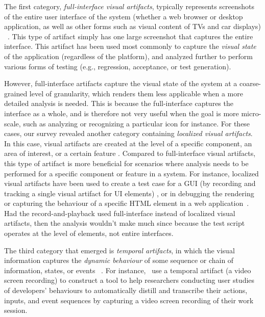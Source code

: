 The first category, \emph{full-interface visual artifacts}, typically represents
screenshots of the entire user interface of the system (whether a web browser or
desktop application, as well as other forms such as visual content of TVs and car displays)
~\cite{Choudhary-2010-ICSM,Delamaro-2011-STVR,
Choudhary-2012-ICST,Semenenko-2013-ICSM,Choudhary-2013-ICSE,Nguyen-2015-ASE,
Mahajan-2015-ICST,Deka-2016-UIST, Hori-2015-SEKE,Mahajan-2016-ICST,Feng-2016-ASE,
Patric-2016-ASE,Deka-2017-UIST,Wan-2017-STVR,He-2016-ICWS,Zhang-2017-ASE,Chen-2017-IUI,
Kirac-2018-JSS,Xu-2018-TOIT,Kuchta-2018-EMSE}.
This type of artifact simply has one large screenshot that captures the entire interface. 
This artifact has been used most commonly to capture the \textit{visual state} of the application
(regardless of the platform), and analyzed further to perform various forms of testing
(e.g., regression, acceptance, or test generation).

However, full-interface artifacts capture the visual state of the system at a coarse-grained
level of granularity, which renders them less applicable when a more detailed analysis is needed. This is because the full-interface 
captures the interface as a whole, and is therefore not very useful when the goal is more micro-scale, such as analyzing or recognizing a particular icon for instance. 
For these cases, our survey revealed another category containing  \emph{localized visual artifacts}.
In this case, visual artifacts are created at the level of a 
specific component, an area of interest, or a certain feature \cite{Chang-2010-CHI,
Alegroth-2013-ICST, Mahajan-2014-ASE, Amalfitano-2014-WISE, Selay-2014-DICTA,
Burg-2015-UIST, Leotta-2018-STVR, canvas_icst2018}.
Compared to full-interface visual artifacts, this type of artifact is more beneficial
for scenarios where analysis needs to be performed for a specific component or feature in a system. 
For instance, localized visual artifacts have been used to create a test case for a GUI
(by recording and tracking a single visual artifact for UI elements) \cite{Chang-2010-CHI},
or in debugging the rendering or capturing the behaviour of a specific HTML element in a web application~\cite{Burg-2015-UIST}. 
Had the record-and-playback used full-interface instead of localized visual artifacts, then the analysis wouldn't make much since because the test script operates at the level of elements, not entire interfaces. 

The third category that emerged is \emph{temporal artifacts}, in which the visual information
captures the \emph{dynamic behaviour} of some sequence or chain of information, states, or events
~\cite{Li-2010-CHI, Lin-2014-TSE,Ponzanelli-2016-ICSE,Bao-2017-EMSE}. 
For instance,~\citet{Bao-2017-EMSE} use a temporal artifact (a video screen recording) to construct a
tool to help researchers conducting user studies of developers' behaviours
to automatically distill and transcribe their actions, inputs, and event sequences
by capturing a video screen recording of their work session.

